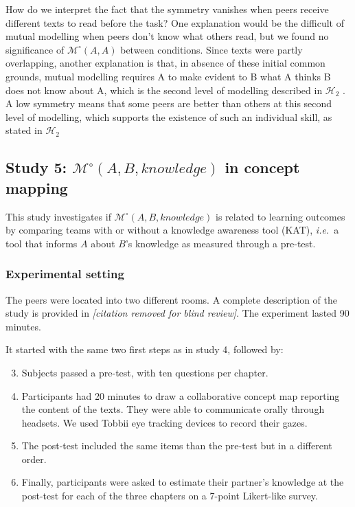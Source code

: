 \documentclass[natbib]{svjour3}
\newcommand{\ie}{{\textit{i.e.\ }}}
\newcommand{\Model}[3]{{$\mathcal{M}^{\circ}(#1, #2, #3)$}}
\newcommand{\gModel}[2]{{$\mathcal{M}^{\circ}(#1, #2)$}}
\begin{document}
How do we interpret the fact that the symmetry vanishes when peers receive different texts to read before the task? One explanation would be the difficult of mutual modelling when peers don't know what others read, but we found no significance of \gModel{A}{A} between conditions. Since texts were partly overlapping, another explanation is that, in absence of these initial common grounds, mutual modelling requires A to make evident to B what A thinks B does not know about A, which is the second level of modelling described in $\mathcal{H}_{2}$ . A low symmetry means that some peers are better than others at this second level of modelling, which supports the existence of such an individual skill, as stated in  $\mathcal{H}_{2}$ 

\subsection{{\bf Study 5}: \Model{A}{B}{knowledge} in concept mapping}

This study investigates if \Model{A}{B}{knowledge} is related to learning
outcomes by comparing teams with or without a knowledge awareness tool (KAT),
\ie a tool that informs $A$ about $B$'s knowledge as measured through a pre-test.

\subsubsection*{Experimental setting}

The peers were located into two different rooms. A complete description of the
study is provided in \textit{[citation removed for blind review]}. The experiment lasted 90 minutes.

It started with the same two first steps as in study 4, followed by:

\begin{enumerate}
    \setcounter{enumi}{2}

    \item Subjects passed a pre-test, with ten questions per chapter. 

    \item Participants had 20 minutes to draw a collaborative concept map
        reporting the content of the texts. They were able to communicate
        orally through headsets.  We used Tobbii eye tracking devices to
        record their gazes.

    \item The post-test included the same items than the pre-test but in a
        different order. 

    \item  Finally, participants were asked to estimate their partner's
        knowledge at the post-test for each of the three chapters on a 7-point
        Likert-like survey. 

\end{enumerate}
\end{document}
